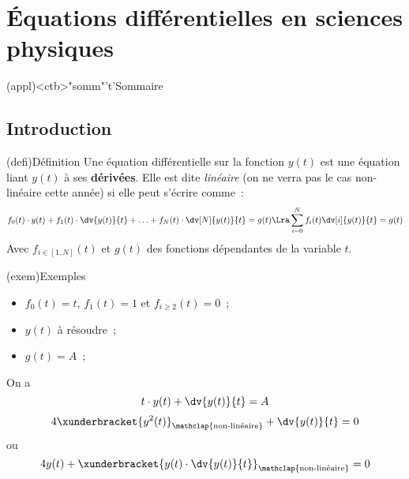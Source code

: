 \documentclass[a4paper, 11pt, garamond]{book}
\begin{document}
\setcounter{chapter}{5}


\chapter{Équations différentielles en sciences physiques}


\begin{tcn}(appl)<ctb>"somm"'t'{Sommaire}
	\let\item\olditem
	\vspace{-15pt}
	\minitoc
	\vspace{-15pt}
\end{tcn}


\section{Introduction}
\begin{tcn}(defi){Définition}
	Une équation différentielle sur la fonction $y(t)$
	est une équation liant $y(t)$ à ses \textbf{dérivées}. Elle est dite
	\textit{linéaire} (on ne verra pas le cas
	non-linéaire cette année) si elle peut s’écrire comme~:
	\[
		f_0(t) \cdot y(t) + f_1(t) \cdot \dv{y(t)}{t} + \ldots + f_N(t) \cdot
		\dv[N]{y(t)}{t} = g(t)
		\Lra
		\sum_{i=0}^{N} f_i(t) \dv[i]{y(t)}{t} = g(t)
	\]
  Avec $f_{i \in [1,N]}(t)$ et $g(t)$ des fonctions dépendantes de la variable
	$t$.
\end{tcn}

\begin{tcn}[sidebyside, sidebyside align=top](exem){Exemples}
	\begin{itemize}
		\item $f_0(t) = t$, $f_1(t) = 1$ et $f_{i \geq 2}(t) = 0$~;
		\item $y(t)$ à résoudre~;
		\item $g(t) = A$~;
	\end{itemize}
	On a
	\[
		t \cdot y(t) + \dv{y(t)}{t} = A
	\]
	\tcblower
	\[
		4\xunderbracket{y^{2}(t)}_{\mathclap{\text{non-linéaire}}} +
		\dv{y(t)}{t} = 0
	\]
	ou
	\[
		4y(t) +
		\xunderbracket{y(t) \cdot \dv{y(t)}{t}}_{\mathclap{\text{non-linéaire}}} = 0
	\]
\end{tcn}
\end{document}
